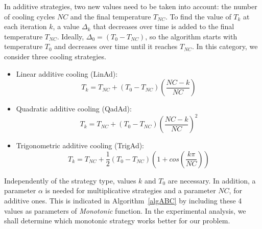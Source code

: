 \documentclass[icae]{iosart2x}
\newcommand{\reviewed}[1]{#1} %
\begin{document}
In additive strategies, two new values need to be taken into account: the number of cooling cycles $NC$ and the final temperature ${T_{NC}}$. To find the value of $T_k$ at each iteration $k$, a value $\Delta_k$ that decreases over time is added to the final temperature ${T_{NC}}$. \reviewed{Ideally, $\Delta_0=(T_0-T_{NC})$}, so the algorithm starts with temperature $T_0$ and decreases over time until it reaches $T_{NC}$. In this category, we consider three cooling strategies.
\begin{itemize}
\item  Linear additive cooling (LinAd):
\begin{equation}
T_{k} = T_{NC} + (T_{0}-T_{NC})(\frac{NC-k}{NC})
\end{equation}
\item Quadratic additive cooling (QadAd):
\begin{equation}
T_{k} = T_{NC} + (T_{0}-T_{NC})(\frac{NC-k}{NC})^2
\end{equation}
\item Trigonometric additive cooling (TrigAd):
\begin{equation}
T_{k} = T_{NC} + \frac{1}{2}(T_{0}-T_{NC})(1 + cos(\frac{k \pi}{NC}))
\end{equation}
\end{itemize}

\reviewed{Independently of the strategy type, values $k$ and $T_0$ are necessary. In addition, a parameter $\alpha$ is needed for multiplicative strategies and a parameter $NC$, for additive ones. This is indicated in Algorithm~\ref{algABC} by including these 4 values as parameters of \textit{Monotonic} function. In the experimental analysis, we shall determine which monotonic strategy works better for our problem.}
\end{document}
